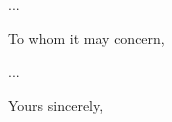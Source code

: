 \documentclass[10pt,english]{letter}
\begin{document}
\begin{letter}{...}

\opening{To whom it may concern,}

...

\closing{Yours sincerely,}
\end{letter}
\end{document}

